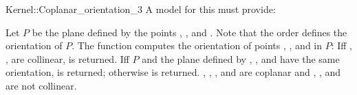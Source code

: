 \begin{ccRefFunctionObjectConcept}{Kernel::Coplanar_orientation_3}
A model for this must provide:


         {Let $P$ be the plane defined by the points , ,
          and . Note that the order defines the orientation of
          $P$. The function computes the orientation of points , 
          , and  in $P$: Iff , ,  are
          collinear,  is returned. Iff $P$ and the plane 
          defined by , , and  have the same orientation, 
           is returned; otherwise  is returned.  
          \ccPrecond {}, , , and  are coplanar and
          , , and  are not collinear.}

\end{ccRefFunctionObjectConcept}

